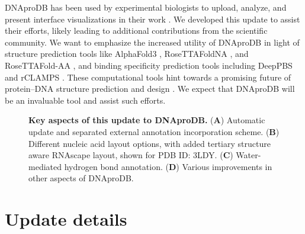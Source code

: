 DNAproDB has been used by experimental biologists to upload, analyze, and present interface visualizations in their work \citep{Webb2024}. We developed this update to assist their efforts, likely leading to additional contributions from the scientific community. We want to emphasize the increased utility of DNAproDB in light of structure prediction tools like AlphaFold3 \citep{Abramson2024}, RoseTTAFoldNA \citep{baek2024na}, and RoseTTAFold-AA \citep{Krishna2024}, and binding specificity prediction tools including DeepPBS \citep{Mitra2024} and rCLAMPS \citep{Wetzel2022}. These computational tools hint towards a promising future of protein–DNA structure prediction and design \citep{Glasscock2023}. We expect that DNAproDB will be an invaluable tool and assist such efforts.

\begin{center}
    \begin{figure}
        \caption[Key aspects of this update to DNAproDB.]{\textbf{Key aspects of this update to DNAproDB.} ({\bf A}) Automatic update and separated external annotation incorporation scheme.  ({\bf B})  Different nucleic acid layout options, with added tertiary structure aware RNAscape layout, shown for PDB ID: 3LDY. ({\bf C}) Water-mediated hydrogen bond annotation. ({\bf D}) Various improvements in other aspects of DNAproDB. }
  \label{fig:dnaprodb1}
\end{figure}
\end{center}


\section{Update details}

